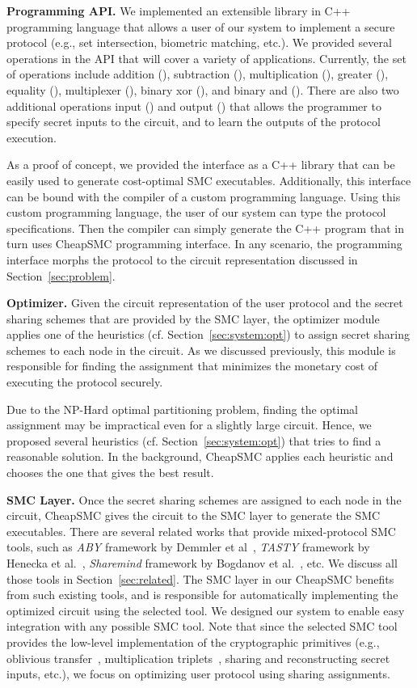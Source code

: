 \documentclass{llncs}
\newcommand{\sysname}{{CheapSMC}\xspace}
\begin{document}
\textbf{Programming API.} We implemented an extensible library in C++ programming language that allows a user of our system to implement a secure protocol (e.g., set intersection, biometric matching, etc.). We provided several operations in the API that will cover a variety of applications. Currently, the set of operations  include addition (), subtraction (), multiplication (), greater (), equality (), multiplexer (), binary xor (), and binary and (). There are also two additional operations input () and output () that allows the programmer to specify secret inputs to the circuit, and to learn the outputs of the protocol execution. 

As a proof of concept, we provided the interface as a C++ library that can be easily used to generate cost-optimal SMC executables. Additionally, this interface can be bound with the compiler of a custom programming language. Using this custom programming language, the user of our system can type the protocol specifications. Then the compiler can simply generate the C++ program that in turn uses \sysname programming interface. In any scenario, the programming interface morphs the protocol to the circuit representation discussed in Section~\ref{sec:problem}. 

\textbf{Optimizer.} Given the circuit representation of the user protocol and the secret sharing schemes that are provided by the SMC layer, the optimizer module applies one of the heuristics (cf. Section~\ref{sec:system:opt}) to assign secret sharing schemes to each node in the circuit. As we discussed previously, this module is responsible for finding the assignment that minimizes the monetary cost of executing the protocol securely. 

Due to the NP-Hard optimal partitioning problem, finding the optimal assignment may be impractical even for a slightly large circuit. Hence, we proposed several heuristics (cf. Section~\ref{sec:system:opt}) that tries to find a reasonable solution. In the background, \sysname applies each heuristic and chooses the one that gives the best result. 

\textbf{SMC Layer.} Once the secret sharing schemes are assigned to each node in the circuit, \sysname gives the circuit to the SMC layer to generate the SMC executables. There are several related works that provide mixed-protocol SMC tools, such as \emph{ABY} framework by Demmler et al~\cite{cite:demmler2015aby}, \emph{TASTY} framework by Henecka et al.~\cite{cite:henecka2010tasty}, \emph{Sharemind} framework by Bogdanov et al.~\cite{cite:bogdanov2008sharemind}, etc. We discuss all those tools in Section~\ref{sec:related}. The SMC layer in our \sysname benefits from such existing tools, and is responsible for automatically implementing the optimized circuit using the selected tool. We designed our system to enable easy integration with any possible SMC tool. Note that since the selected SMC tool provides the low-level implementation of the cryptographic primitives (e.g., oblivious transfer~\cite{cite:naor2001efficient, cite:rabin2005exchange}, multiplication triplets~\cite{cite:beaver1992efficient}, sharing and reconstructing secret inputs, etc.), we focus on optimizing user protocol using sharing assignments.
\end{document}

